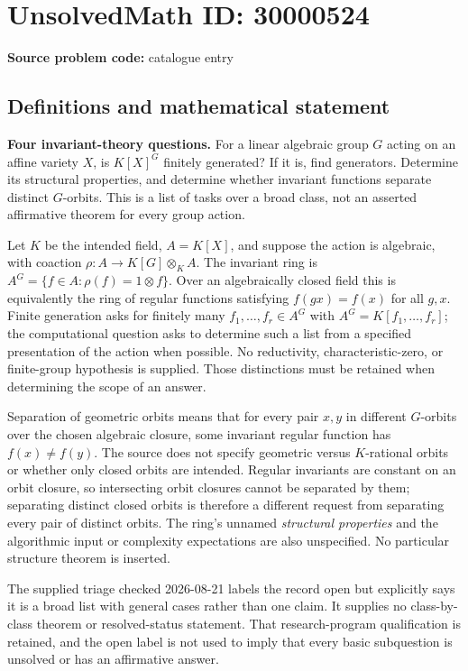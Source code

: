 \documentclass[11pt]{article}
\begin{document}
\section*{UnsolvedMath ID: 30000524}
\textbf{Source problem code:} catalogue entry
\subsection{Definitions and mathematical statement}
\textbf{Four invariant-theory questions.} For a linear algebraic group \(G\) acting on an affine variety \(X\), is \(K[X]^G\) finitely generated? If it is, find generators. Determine its structural properties, and determine whether invariant functions separate distinct \(G\)-orbits. This is a list of tasks over a broad class, not an asserted affirmative theorem for every group action.\par Let \(K\) be the intended field, \(A=K[X]\), and suppose the action is algebraic, with coaction \(\rho:A\to K[G]\otimes_KA\). The invariant ring is \(A^G=\{f\in A:\rho(f)=1\otimes f\}\). Over an algebraically closed field this is equivalently the ring of regular functions satisfying \(f(gx)=f(x)\) for all \(g,x\). Finite generation asks for finitely many \(f_1,\ldots,f_r\in A^G\) with \(A^G=K[f_1,\ldots,f_r]\); the computational question asks to determine such a list from a specified presentation of the action when possible. No reductivity, characteristic-zero, or finite-group hypothesis is supplied. Those distinctions must be retained when determining the scope of an answer.\par Separation of geometric orbits means that for every pair \(x,y\) in different \(G\)-orbits over the chosen algebraic closure, some invariant regular function has \(f(x)\ne f(y)\). The source does not specify geometric versus \(K\)-rational orbits or whether only closed orbits are intended. Regular invariants are constant on an orbit closure, so intersecting orbit closures cannot be separated by them; separating distinct closed orbits is therefore a different request from separating every pair of distinct orbits. The ring's unnamed \emph{structural properties} and the algorithmic input or complexity expectations are also unspecified. No particular structure theorem is inserted.\par The supplied triage checked 2026-08-21 labels the record open but explicitly says it is a broad list with general cases rather than one claim. It supplies no class-by-class theorem or resolved-status statement. That research-program qualification is retained, and the open label is not used to imply that every basic subquestion is unsolved or has an affirmative answer.
\end{document}

